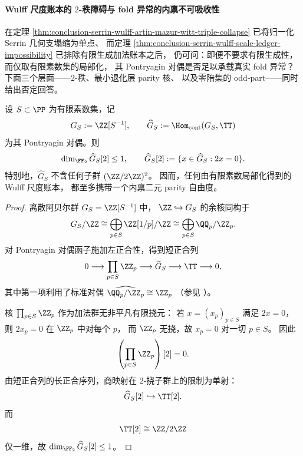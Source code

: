 \paragraph{Wulff 尺度账本的 \texorpdfstring{$2$}{2}-秩障碍与 fold 异常的内禀不可吸收性}

在定理 \ref{thm:conclusion-serrin-wulff-artin-mazur-witt-triple-collapse}
已将归一化 Serrin 几何支塌缩为单点、
而定理 \ref{thm:conclusion-serrin-wulff-scale-ledger-impossibility}
已排除有限生成加法账本之后，
仍可问：即便不要求有限生成性，而仅取有限素数集的局部化，
其 Pontryagin 对偶是否足以承载真实 fold 异常？
下面三个层面——$2$-秩、最小退化层 parity 核、
以及零陪集的 odd-part——同时给出否定回答。

\begin{theorem}\label{thm:conclusion-serrin-wulff-localized-parity-rank-one}
设 \(S\subset\PP\) 为有限素数集，记
\[
G_S:=\ZZ[S^{-1}],
\qquad
\widehat G_S:=\Hom_{\mathrm{cont}}(G_S,\TT)
\]
为其 Pontryagin 对偶。则
\[
\dim_{\FF_2}\widehat G_S[2]\le 1,
\qquad
\widehat G_S[2]:=\{x\in \widehat G_S:2x=0\}.
\]
特别地，\(\widehat G_S\) 不含任何子群 \((\ZZ/2\ZZ)^2\)。
因而，任何由有限素数局部化得到的 Wulff 尺度账本，
都至多携带一个内禀二元 parity 自由度。
\end{theorem}
\begin{proof}
离散阿贝尔群 \(G_S=\ZZ[S^{-1}]\) 中，
\(\ZZ\hookrightarrow G_S\) 的余核同构于
\[
G_S/\ZZ
\cong
\bigoplus_{p\in S}\ZZ[1/p]/\ZZ
\cong
\bigoplus_{p\in S}\QQ_p/\ZZ_p.
\]
对 Pontryagin 对偶函子施加左正合性，得到短正合列
\[
0\longrightarrow
\prod_{p\in S}\ZZ_p
\longrightarrow
\widehat G_S
\longrightarrow
\TT
\longrightarrow 0,
\]
其中第一项利用了标准对偶
\(\widehat{\QQ_p/\ZZ_p}\cong \ZZ_p\)
（参见 \cite{MorrisPontryaginDuality1977}）。

核 \(\prod_{p\in S}\ZZ_p\) 作为加法群无非平凡有限挠元：
若 \(x=(x_p)_{p\in S}\) 满足 \(2x=0\)，
则 \(2x_p=0\) 在 \(\ZZ_p\) 中对每个 \(p\)，
而 \(\ZZ_p\) 无挠，故 \(x_p=0\) 对一切 \(p\in S\)。
因此
\[
\left(\prod_{p\in S}\ZZ_p\right)[2]=0.
\]
由短正合列的长正合序列，商映射在 \(2\)-挠子群上的限制为单射：
\[
\widehat G_S[2]\hookrightarrow \TT[2].
\]
而
\[
\TT[2]\cong \ZZ/2\ZZ
\]
仅一维，故
\(\dim_{\FF_2}\widehat G_S[2]\le 1\)。
\end{proof}

